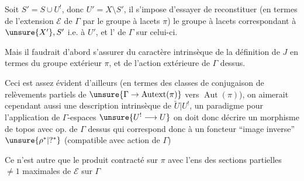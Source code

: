 Soit \(S'=S\cup U^!\), donc \(U'=X\setminus S'\),
il s'impose d'essayer de reconstituer
(en termes de l'extension \(\mathcal E\) de \(\Gamma\) par le groupe à
lacets \(\pi\)) le groupe  à lacets correspondant
à \(\unsure{X'},S'\) i.e. à \(U'\), et l'
 de \(\Gamma\) sur celui-ci.

Mais il faudrait d'abord s'assurer du caractère intrinsèque de la
définition de \(J\) 
en termes du  
groupe extérieur \(\pi\), et de l'action
 extérieure de \(\Gamma\) dessus.


Ceci est assez évident d'ailleurs
(en termes  des classes de
\inserted{\(\pi\)-}conjugaison de relèvements partiels de
\(\unsure{\Gamma\to\operatorname{Autext}(\pi)}\) vers
\(\operatorname{Aut}(\pi)\)), on aimerait cependant aussi une
description intrinsèque de \(\widetilde U|U^!\),
 un paradigme pour l'application de
\(\Gamma\)-espaces \(\unsure{U^!\longrightarrow U}\)
on doit donc décrire un morphisme de topos avec op. de \(\Gamma\) dessus
qui correspond donc à un  foncteur
``image inverse'' \(\unsure{\rho^*|?^*}\)
(compatible avec action de \(\Gamma\))

Ce  n'est autre que le produit contracté sur
\(\pi\) avec l'ens des sections partielles \(\ne1\) maximales de
\(\mathcal E\) sur \(\Gamma\)


